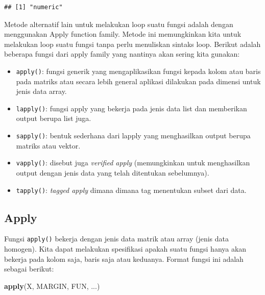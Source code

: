 \documentclass[
]{book}
\newenvironment{Shaded}{\begin{snugshade}}{\end{snugshade}}
\newcommand{\FunctionTok}[1]{\textcolor[rgb]{0.13,0.29,0.53}{\textbf{#1}}}
\newcommand{\NormalTok}[1]{#1}
\providecommand{\tightlist}{%
  \setlength{\itemsep}{0pt}\setlength{\parskip}{0pt}}
\theoremstyle{definition}
\theoremstyle{definition}
\theoremstyle{definition}
\theoremstyle{definition}
\theoremstyle{remark}
\begin{document}
\begin{verbatim}
## [1] "numeric"
\end{verbatim}

Metode alternatif lain untuk melakukan loop suatu fungsi adalah dengan menggunakan Apply function family. Metode ini memungkinkan kita untuk melakukan loop suatu fungsi tanpa perlu menuliskan sintaks loop. Berikut adalah beberapa fungsi dari apply family yang nantinya akan sering kita gunakan:

\begin{itemize}
\tightlist
\item
  \texttt{apply()}: fungsi generik yang mengaplikasikan fungsi kepada kolom atau baris pada matriks atau secara lebih general aplikasi dilakukan pada dimensi untuk jenis data array.
\item
  \texttt{lapply()}: fungsi apply yang bekerja pada jenis data list dan memberikan output berupa list juga.
\item
  \texttt{sapply()}: bentuk sederhana dari lapply yang menghasilkan output berupa matriks atau vektor.
\item
  \texttt{vapply()}: disebut juga \emph{verified apply} (memungkinkan untuk menghasilkan output dengan jenis data yang telah ditentukan sebelumnya).
\item
  \texttt{tapply()}: \emph{tagged apply} dimana dimana tag menentukan subset dari data.
\end{itemize}

\hypertarget{apply}{%
\subsection{Apply}\label{apply}}

Fungsi \texttt{apply()} bekerja dengan jenis data matrik atau array (jenis data homogen). Kita dapat melakukan spesifikasi apakah suatu fungsi hanya akan bekerja pada kolom saja, baris saja atau keduanya. Format fungsi ini adalah sebagai berikut:

\begin{Shaded}
\begin{Highlighting}[]
\FunctionTok{apply}\NormalTok{(X, MARGIN, FUN, ...)}
\end{Highlighting}
\end{Shaded}
\end{document}
